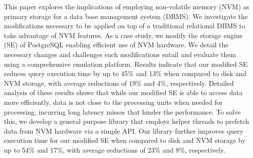 This paper explores the implications of employing non-volatile memory (NVM) as primary storage for a data base management system (DBMS). We investigate the modifications necessary to be applied on top of a traditional relational DBMS to take advantage of NVM features. As a case study, we modify the storage engine (SE) of PostgreSQL enabling efficient use of NVM hardware. We detail the necessary changes and challenges such modifications entail and evaluate them using a comprehensive emulation platform. Results indicate that our modified SE reduces query execution time by up to 45\% and 13\% when compared to disk and NVM storage, with average reductions of 19\% and 4\%, respectively. Detailed analysis of these results shows that while our modified SE is able to access data more efficiently, data is not close to the processing units when needed for processing, incurring long latency misses that hinder the performance. To solve this, we develop a general purpose library that employs helper threads to prefetch data from NVM hardware via a simple API. Our library further improves query execution time for our modified SE when compared to disk and NVM storage by up to 54\% and 17\%, with average reductions of 23\% and 8\%, respectively.